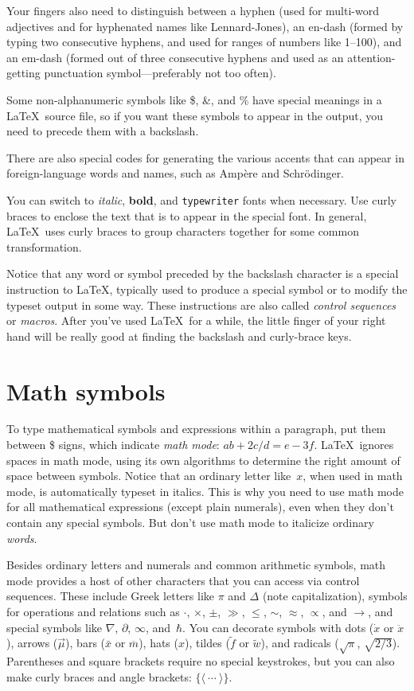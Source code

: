 \documentclass[prb,preprint]{revtex4-1}
\begin{document}
Your fingers also need to distinguish between a hyphen (used for
multi-word adjectives and for hyphenated names like Lennard-Jones), an 
en-dash (formed by typing two consecutive hyphens, and used for ranges 
of numbers like 1--100), and an em-dash (formed out of three consecutive
hyphens and used as an attention-getting punctuation symbol---preferably 
not too often).

Some non-alphanumeric symbols like \$, \&, and \% have special meanings 
in a \LaTeX\ source file, so if you want these symbols to appear in the output, 
you need to precede them with a backslash.

There are also special codes for generating the various accents
that can appear in foreign-language words and names, such as Amp\`ere
and Schr\"odinger.\cite{FontEncodingComment}

You can switch to \textit{italic}, \textbf{bold}, and \texttt{typewriter} fonts
when necessary. Use curly braces to enclose the text that is to appear in 
the special font. In general, \LaTeX\ uses curly braces to group characters 
together for some common transformation.

Notice that any word or symbol preceded by the backslash character is
a special instruction to \LaTeX, typically used to produce a special 
symbol or to modify the typeset output in some way. These instructions 
are also called \textit{control sequences} or \textit{macros}.  
After you've used \LaTeX\ for a while, the little finger of your right 
hand will be really good at finding the backslash and curly-brace keys.


\section{Math symbols}

To type mathematical symbols and expressions within a paragraph, put
them between \$ signs, which indicate \textit{math mode}: $ab + 2c/d = e-3f$.
\LaTeX\ ignores spaces in math mode, using its own algorithms to determine
the right amount of space between symbols.  Notice that an ordinary letter 
like~$x$, when used in math mode, is automatically typeset in italics. 
This is why you need to use math mode for all mathematical
expressions (except plain numerals), even when they don't contain any 
special symbols.  But don't use math mode to italicize ordinary \textit{words}.

Besides ordinary letters and numerals and common arithmetic symbols, math 
mode provides a host of other characters that you can access via control 
sequences.\cite{wikimathpage} These include Greek letters like $\pi$ and 
$\Delta$ (note capitalization), symbols for operations and relations such 
as $\cdot$, $\times$, $\pm$, $\gg$, $\leq$, $\sim$, $\approx$, $\propto$, 
and $\rightarrow$, and special symbols like $\nabla$, $\partial$, $\infty$, 
and~$\hbar$. You can decorate symbols with dots ($\dot x$ or $\ddot x$), 
arrows ($\vec\mu$), bars ($\bar x$ or $\overline m$), hats ($\hat x$), 
tildes ($\tilde f$ or $\widetilde w$), and radicals ($\sqrt\pi$, $\sqrt{2/3}$).
Parentheses and square brackets require no special keystrokes, but you
can also make curly braces and angle brackets: $\{\langle\ \cdots\ \rangle\}$.
\end{document}
